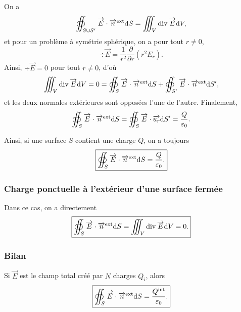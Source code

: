             On a 
            \begin{equation}
                \oiint_{S\cup S'}\protect\overrightarrow{{E}}\cdot\protect\overrightarrow{{n}}^{\text{ext}}\mathrm{d} S=\iiint_{V}\operatorname{div}\protect\overrightarrow{{E}}\mathrm{d} V,
            \end{equation}
            et pour un problème à symétrie sphérique, on a pour tout $r\neq0$,
            \begin{equation}
                \div\vec{E}=\frac{1}{r^{2}}\frac{\partial}{\partial r}\left(r^{2}E_r\right).
            \end{equation}
            Ainsi, $\div\vec{E}=0$ pour tout $r\neq 0$, d'où 
            \begin{align}
                \iiint_{V}\operatorname{div}\protect\overrightarrow{{E}}\mathrm{d} V=0=\oiint_{S}\protect\overrightarrow{{E}}\cdot\protect\overrightarrow{{n}}^{\text{ext}}\mathrm{d} S+\oiint_{S'}\protect\overrightarrow{{E}}\cdot\protect\overrightarrow{{n}}^{\text{ext}}\mathrm{d} S',
            \end{align}
            et les deux normales extérieures sont opposées l'une de l'autre. Finalement,
            \begin{equation}
                \oiint_{S}\protect\overrightarrow{{E}}\cdot\protect\overrightarrow{{n}}^{\text{ext}}\mathrm{d} S=\oiint_{S}\protect\overrightarrow{{E}}\cdot\protect\overrightarrow{{u_r}}\mathrm{d} S'=\frac{Q}{\varepsilon_{0}}.
            \end{equation}

            Ainsi, si une surface $S$ contient une charge $Q$, on a toujours
            \begin{equation}
                \boxed{
                    \oiint_{S}\protect\overrightarrow{{E}}\cdot\protect\overrightarrow{{n}}^{\text{ext}}\mathrm{d} S=\frac{Q}{\varepsilon_{0}}.
                }
            \end{equation}

        \subsubsection{Charge ponctuelle à l'extérieur d'une surface fermée}

            Dans ce cas, on a directement
            \begin{equation}
                \boxed{
                    \oiint_{S}\protect\overrightarrow{{E}}\cdot\protect\overrightarrow{{n}}^{\text{ext}}\mathrm{d} S=\iiint_{V}\operatorname{div}\protect\overrightarrow{{E}}\mathrm{d} V=0.
                }
            \end{equation}

        \subsubsection{Bilan}

            Si $\vec{E}$ est le champ total créé par $N$ charges $Q_i$, alors
            \begin{equation}
                \boxed{
                    \oiint_{S}\protect\overrightarrow{{E}}\cdot\protect\overrightarrow{{n}}^{\text{ext}}\mathrm{d} S=\frac{Q^{\text{int}}}{\varepsilon_{0}}.
                }
            \end{equation}

